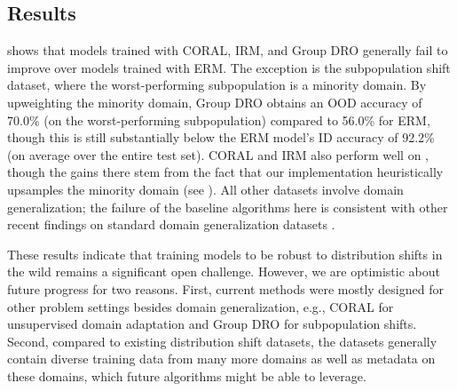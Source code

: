\subsection{Results}
 shows that models trained with CORAL, IRM, and Group DRO generally fail to improve over models trained with ERM.
The exception is the \CivilComments subpopulation shift dataset, where the worst-performing subpopulation is a minority domain. By upweighting the minority domain, Group DRO obtains an OOD accuracy of 70.0\% (on the worst-performing subpopulation) compared to 56.0\% for ERM, though this is still substantially below the ERM model's ID accuracy of 92.2\% (on average over the entire test set). CORAL and IRM also perform well on \CivilComments, though the gains there stem from the fact that our implementation heuristically upsamples the minority domain (see ).
All other datasets involve domain generalization; the failure of the baseline algorithms here is consistent with other recent findings on standard domain generalization datasets \citep{gulrajani2020search}.

These results indicate that training models to be robust to distribution shifts in the wild remains a significant open challenge. However, we are optimistic about future progress for two reasons.
First, current methods were mostly designed for other problem settings besides domain generalization, e.g., CORAL for unsupervised domain adaptation and Group DRO for subpopulation shifts.
Second, compared to existing distribution shift datasets, the \Wilds datasets generally contain diverse training data from many more domains as well as metadata on these domains, which future algorithms might be able to leverage.
